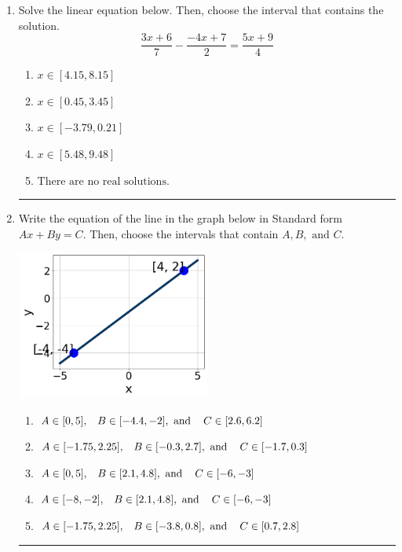 \documentclass[14pt]{extbook}
\newcommand{\litem}[1]{\item#1\hspace*{-1cm}\rule{\textwidth}{0.4pt}}
\begin{document}
\begin{enumerate}
{\begin{enumerate}[label=\Alph*.]
\end{enumerate} }
\litem{
Solve the linear equation below. Then, choose the interval that contains the solution.\[ \frac{3x + 6}{7} - \frac{-4x + 7}{2} = \frac{5x + 9}{4} \]\begin{enumerate}[label=\Alph*.]
\item \( x \in [4.15, 8.15] \)
\item \( x \in [0.45, 3.45] \)
\item \( x \in [-3.79, 0.21] \)
\item \( x \in [5.48, 9.48] \)
\item \( \text{There are no real solutions.} \)

\end{enumerate} }
\litem{
Write the equation of the line in the graph below in Standard form $Ax+By=C$. Then, choose the intervals that contain $A, B, \text{ and } C$.
\begin{center}
    \includegraphics[width=0.5\textwidth]{../Figures/linearGraphToStandardB.png}
\end{center}
\begin{enumerate}[label=\Alph*.]
\item \( A \in [0, 5], \hspace{3mm} B \in [-4.4, -2], \text{ and } \hspace{3mm} C \in [2.6, 6.2] \)
\item \( A \in [-1.75, 2.25], \hspace{3mm} B \in [-0.3, 2.7], \text{ and } \hspace{3mm} C \in [-1.7, 0.3] \)
\item \( A \in [0, 5], \hspace{3mm} B \in [2.1, 4.8], \text{ and } \hspace{3mm} C \in [-6, -3] \)
\item \( A \in [-8, -2], \hspace{3mm} B \in [2.1, 4.8], \text{ and } \hspace{3mm} C \in [-6, -3] \)
\item \( A \in [-1.75, 2.25], \hspace{3mm} B \in [-3.8, 0.8], \text{ and } \hspace{3mm} C \in [0.7, 2.8] \)


\end{enumerate}}
\end{enumerate}
\end{document}
